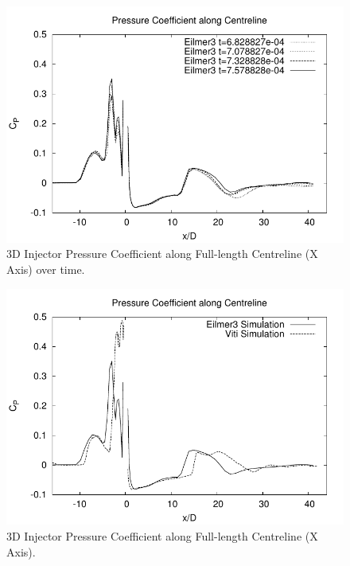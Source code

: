 %
\begin{figure}[htbp]
 \begin{center}
  \includegraphics[width=14cm]{./chap8-3Dinjector/figs/normalisedCP_all.pdf}
  \caption{3D Injector Pressure Coefficient along Full-length Centreline (X Axis) over time.}
  \label{f:tc3:cpcentrelineovertime}
 \end{center}
\end{figure}
%
\begin{figure}[htbp]
 \begin{center}
  \includegraphics[width=14cm]{./chap8-3Dinjector/figs/normalisedCP_fullres.pdf}
  \caption{3D Injector Pressure Coefficient along Full-length Centreline (X Axis).}
  \label{f:tc3:cpcentrelinefullres}
 \end{center}
\end{figure}
